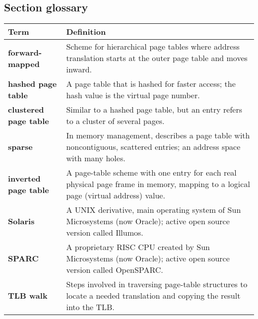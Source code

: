 \subsection*{Section glossary}
\begin{tabular}{p{}p{}}
    \toprule
    \textbf{Term} & \textbf{Definition} \\
    \midrule
    \textbf{forward-mapped} & Scheme for hierarchical page tables where address translation starts at the outer page table and moves inward. \\
    \textbf{hashed page table} & A page table that is hashed for faster access; the hash value is the virtual page number. \\
    \textbf{clustered page table} & Similar to a hashed page table, but an entry refers to a cluster of several pages. \\
    \textbf{sparse} & In memory management, describes a page table with noncontiguous, scattered entries; an address space with many holes. \\
    \textbf{inverted page table} & A page-table scheme with one entry for each real physical page frame in memory, mapping to a logical page (virtual address) value. \\
    \textbf{Solaris} & A UNIX derivative, main operating system of Sun Microsystems (now Oracle); active open source version called Illumos. \\
    \textbf{SPARC} & A proprietary RISC CPU created by Sun Microsystems (now Oracle); active open source version called OpenSPARC. \\
    \textbf{TLB walk} & Steps involved in traversing page-table structures to locate a needed translation and copying the result into the TLB. \\
    \bottomrule
\end{tabular}
